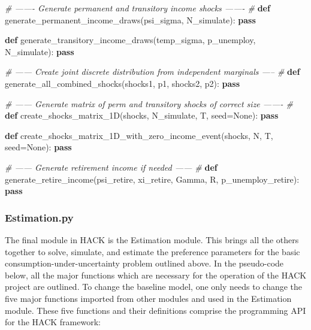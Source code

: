 \documentclass[]{article}
\newenvironment{Shaded}{}{}
\newcommand{\KeywordTok}[1]{\textcolor[rgb]{0.00,0.44,0.13}{\textbf{{#1}}}}
\newcommand{\CommentTok}[1]{\textcolor[rgb]{0.38,0.63,0.69}{\textit{{#1}}}}
\newcommand{\OtherTok}[1]{\textcolor[rgb]{0.00,0.44,0.13}{{#1}}}
\newcommand{\NormalTok}[1]{{#1}}
\begin{document}
\begin{Shaded}
\begin{Highlighting}[]
\CommentTok{# ------- Generate permanent and transitory income shocks ------- #}
\KeywordTok{def} \NormalTok{generate_permanent_income_draws(psi_sigma, N_simulate):}
    \KeywordTok{pass}

\KeywordTok{def} \NormalTok{generate_transitory_income_draws(temp_sigma, p_unemploy, N_simulate):}
    \KeywordTok{pass}

\CommentTok{# ------ Create joint discrete distribution from independent marginals ----- #}
\KeywordTok{def} \NormalTok{generate_all_combined_shocks(shocks1, p1, shocks2, p2):}
    \KeywordTok{pass}

\CommentTok{# ------ Generate matrix of perm and transitory shocks of correct size ------- #}
\KeywordTok{def} \NormalTok{create_shocks_matrix_1D(shocks, N_simulate, T, seed=}\OtherTok{None}\NormalTok{):}
    \KeywordTok{pass}

\KeywordTok{def} \NormalTok{create_shocks_matrix_1D_with_zero_income_event(shocks, N, T, seed=}\OtherTok{None}\NormalTok{):}
    \KeywordTok{pass}

\CommentTok{# ------ Generate retirement income if needed ------ #}
\KeywordTok{def} \NormalTok{generate_retire_income(psi_retire, xi_retire, Gamma, R, p_unemploy_retire):}
    \KeywordTok{pass}
\end{Highlighting}
\end{Shaded}

\subsubsection{Estimation.py}\label{estimation.py}

The final module in HACK is the Estimation module. This brings all the
others together to solve, simulate, and estimate the preference
parameters for the basic consumption-under-uncertainty problem outlined
above. In the pseudo-code below, all the major functions which are
necessary for the operation of the HACK project are outlined. To change
the baseline model, one only needs to change the five major functions
imported from other modules and used in the Estimation module. These
five functions and their definitions comprise the programming API for
the HACK framework:
\end{document}
